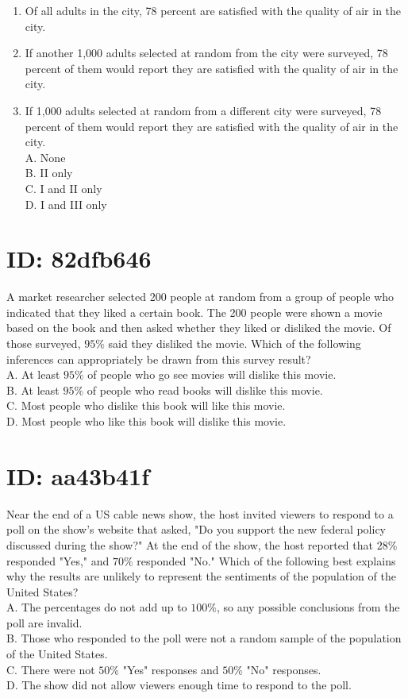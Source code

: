 \begin{enumerate}
  \item Of all adults in the city, 78 percent are satisfied with the quality of air in the city.
  \item If another 1,000 adults selected at random from the city were surveyed, 78 percent of them would report they are satisfied with the quality of air in the city.
  \item If 1,000 adults selected at random from a different city were surveyed, 78 percent of them would report they are satisfied with the quality of air in the city.\\
A. None\\
B. II only\\
C. I and II only\\
D. I and III only
\end{enumerate}

\section*{ID: 82dfb646}
A market researcher selected 200 people at random from a group of people who indicated that they liked a certain book. The 200 people were shown a movie based on the book and then asked whether they liked or disliked the movie. Of those surveyed, $95 \%$ said they disliked the movie. Which of the following inferences can appropriately be drawn from this survey result?\\
A. At least $95 \%$ of people who go see movies will dislike this movie.\\
B. At least $95 \%$ of people who read books will dislike this movie.\\
C. Most people who dislike this book will like this movie.\\
D. Most people who like this book will dislike this movie.

\section*{ID: aa43b41f}
Near the end of a US cable news show, the host invited viewers to respond to a poll on the show's website that asked, "Do you support the new federal policy discussed during the show?" At the end of the show, the host reported that $28 \%$ responded "Yes," and $70 \%$ responded "No." Which of the following best explains why the results are unlikely to represent the sentiments of the population of the United States?\\
A. The percentages do not add up to $100 \%$, so any possible conclusions from the poll are invalid.\\
B. Those who responded to the poll were not a random sample of the population of the United States.\\
C. There were not $50 \%$ "Yes" responses and $50 \%$ "No" responses.\\
D. The show did not allow viewers enough time to respond to the poll.

